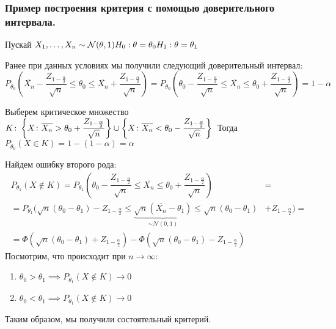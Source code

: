 \subsubsection{Пример построения критерия с помощью доверительного интервала.}
\begin{example}
Пускай $X_1,\ldots,X_n\sim\mathcal{N}(\theta,1)\\ H_0:\theta=\theta_0\\ H_1:\theta=\theta_1$

Ранее при данных условиях мы получили следующий доверительный интервал:
$$P_{\theta_0}\left(\overline{X_n}-\dfrac{Z_{1-\frac{\alpha}{2}}}{\sqrt{n}}\leq \theta_0\leq \overline{X_n}+\dfrac{Z_{1-\frac{\alpha}{2}}}{\sqrt{n}}\right)=P_{\theta_0}\left(\theta_0-\dfrac{Z_{1-\frac{\alpha}{2}}}{\sqrt{n}}\leq \overline{X_n}\leq \theta_0+\dfrac{Z_{1-\frac{\alpha}{2}}}{\sqrt{n}}\right)=1-\alpha$$

Выберем критическое множество $K\colon \left\{X\colon
\overline{X_n}>\theta_0+\dfrac{Z_{1-\frac{\alpha}{2}}}{\sqrt{n}}\right\}\cup\left\{X\colon \overline{X_n}<\theta_0-\dfrac{Z_{1-\frac{\alpha}{2}}}{\sqrt{n}}\right\}\\$
Тогда $P_{\theta_0}(X\in K)=1-(1-\alpha)=\alpha$

Найдем ошибку второго рода: 
        \begin{align}
            P_{\theta_1}(X\notin K)=P_{\theta_1}\left(\theta_0-\dfrac{Z_{1-\frac{\alpha}{2}}}{\sqrt{n}}\leq \overline{X_n}\leq \theta_0+\dfrac{Z_{1-\frac{\alpha}{2}}}{\sqrt{n}}\right)&=
        \\
        =P_{\theta_1}\Bigg(\sqrt{n}\left(\theta_0-\theta_1\right)-Z_{1-\frac{\alpha}{2}}\leq \underbrace{\sqrt{n}\left(\overline{X_n}-\theta_1\right)}_{\sim\mathcal{N}(0,1)}\leq \sqrt{n}\left(\theta_0-\theta_1\right)&+Z_{1-\frac{\alpha}{2}}\Bigg)=
        \\
        =\Phi\left(\sqrt{n}\left(\theta_0-\theta_1\right)+Z_{1-\frac{\alpha}{2}}\right)-\Phi\left(\sqrt{n}\left(\theta_0-\theta_1\right)-Z_{1-\frac{\alpha}{2}}\right)
        \end{align}
Посмотрим, что происходит при $n\rightarrow \infty$:
\begin{enumerate}
    \item $\theta_0>\theta_1\implies P_{\theta_1}(X\notin K)\rightarrow 0$
    \item $\theta_0<\theta_1\implies P_{\theta_1}(X\notin K)\rightarrow 0$
\end{enumerate}
Таким образом, мы получили состоятельный критерий.
\end{example}

